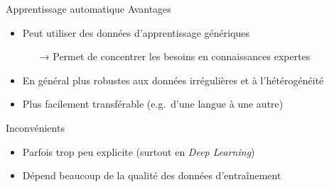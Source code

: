 \documentclass[hyperref={unicode}, xcolor={svgnames}, french]{beamer}
\begin{document}
\begin{frame}{Apprentissage automatique}
    Avantages
    \begin{itemize}
        \item Peut utiliser des données d'apprentissage génériques
            \begin{itemize}
                \item[→] Permet de concentrer les besoins en connaissances expertes
            \end{itemize}
        \item En général plus robustes aux données irrégulières et à l'hétérogénéité
        \item Plus facilement transférable (e.g.\ d'une langue à une autre)
    \end{itemize}
    Inconvénients
    \begin{itemize}
        \item Parfois trop peu explicite (surtout en \textit{Deep Learning})
        \item Dépend beaucoup de la qualité des données d'entraînement
    \end{itemize}
\end{frame}
\end{document}

